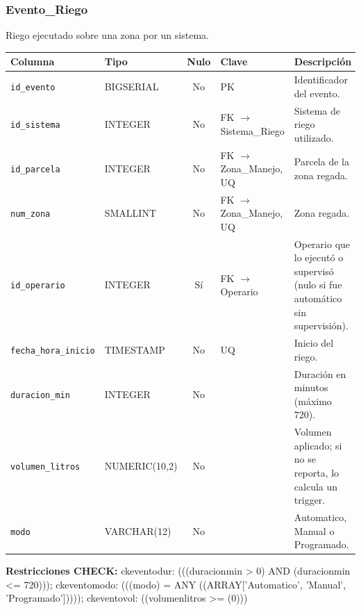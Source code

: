\documentclass[11pt,letterpaper]{article}
\newcommand{\tbus}{\textunderscore\allowbreak}
\newcommand{\tb}[1]{{\ttfamily\let\_\tbus #1}}
\begin{document}
\subsubsection*{Evento\_Riego}
Riego ejecutado sobre una zona por un sistema.
{\footnotesize
\begin{longtable}{>{\raggedright\arraybackslash}p{3.3cm}>{\raggedright\arraybackslash}p{2.5cm}c>{\raggedright\arraybackslash}p{2.2cm}>{\raggedright\arraybackslash}p{6.1cm}}
\toprule
\textbf{Columna} & \textbf{Tipo} & \textbf{Nulo} & \textbf{Clave} & \textbf{Descripción} \\
\midrule
\endhead
\texttt{id\_evento} & BIGSERIAL & No & PK & Identificador del evento. \\
\texttt{id\_sistema} & INTEGER & No & FK $\to$ Sistema\_Riego & Sistema de riego utilizado. \\
\texttt{id\_parcela} & INTEGER & No & FK $\to$ Zona\_Manejo, UQ & Parcela de la zona regada. \\
\texttt{num\_zona} & SMALLINT & No & FK $\to$ Zona\_Manejo, UQ & Zona regada. \\
\texttt{id\_operario} & INTEGER & Sí & FK $\to$ Operario & Operario que lo ejecutó o supervisó (nulo si fue automático sin supervisión). \\
\texttt{fecha\_hora\_inicio} & TIMESTAMP & No & UQ & Inicio del riego. \\
\texttt{duracion\_min} & INTEGER & No &  & Duración en minutos (máximo 720). \\
\texttt{volumen\_litros} & NUMERIC(10,2) & No &  & Volumen aplicado; si no se reporta, lo calcula un trigger. \\
\texttt{modo} & VARCHAR(12) & No &  & Automatico, Manual o Programado. \\
\bottomrule
\end{longtable}}
{\footnotesize\textbf{Restricciones CHECK:} \tb{ck\_evento\_dur}: \tb{(((duracion\_min > 0) AND (duracion\_min <= 720)))}; \tb{ck\_evento\_modo}: \tb{(((modo) = ANY ((ARRAY['Automatico', 'Manual', 'Programado']))))}; \tb{ck\_evento\_vol}: \tb{((volumen\_litros >= (0)))}\par}
\medskip
\end{document}
